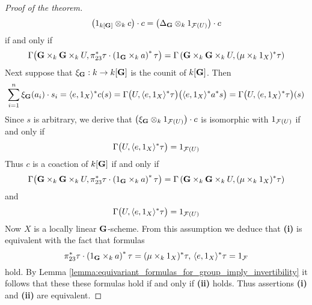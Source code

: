 \begin{proof}[Proof of the theorem]
$$\big(1_{k[\mathbf{G}]}\otimes_k c\big) \cdot c = \big(\Delta_{\mathbf{G}}\otimes_k 1_{{\mathcal F}(U)}\big)\cdot c$$
if and only if
$$\Gamma\big(\mathbf{G}\times_k \mathbf{G} \times_kU, \pi_{23}^*\tau\cdot \left(1_{\mathbf{G}}\times_k a\right)^*\tau \big) = \Gamma\left(\mathbf{G}\times_k\mathbf{G}\times_kU, (\mu\times_k 1_X)^*\tau \right)$$
Next suppose that $\xi_{\mathbf{G}}:k\rightarrow k[\mathbf{G}]$ is the counit of $k[\mathbf{G}]$. Then
$$\sum_{i=1}^n \xi_{\mathbf{G}}(a_i) \cdot s_i = \langle e, 1_X\rangle^*c(s) = \Gamma\big(U, \langle e,1_X \rangle^*\tau \big)\big(\langle e, 1_X\rangle^*a^*s\big) = \Gamma\big(U, \langle e, 1_X \rangle^*\tau \big)(s)$$
Since $s$ is arbitrary, we derive that $\big(\xi_{\mathbf{G}} \otimes_k 1_{{\mathcal F}(U)}\big)\cdot c$ is isomorphic with $1_{{\mathcal F}(U)}$ if and only if
$$\Gamma\big(U, \langle e, 1_X \rangle^*\tau \big) = 1_{{\mathcal F}(U)}$$
Thus $c$ is a coaction of $k[\mathbf{G}]$ if and only if
$$\Gamma\big(\mathbf{G}\times_k \mathbf{G} \times_kU, \pi_{23}^*\tau\cdot \left(1_{\mathbf{G}}\times_k a\right)^*\tau \big) = \Gamma\left(\mathbf{G}\times_k\mathbf{G}\times_kU, (\mu\times_k 1_X)^*\tau \right)$$
and
$$\Gamma\big(U, \langle e,1_X \rangle^*\tau \big) = 1_{{\mathcal F}(U)}$$
Now $X$ is a locally linear $\mathbf{G}$-scheme. From this assumption we deduce that \textbf{(i)} is equivalent with the fact that formulas
$$\pi_{23}^*\tau\cdot \left(1_{\mathbf{G}}\times_k a\right)^*\tau= (\mu\times_k 1_X)^*\tau,\,\langle e,1_X \rangle^*\tau = 1_{{\mathcal F}}$$
hold. By Lemma \ref{lemma:equivariant_formulas_for_group_imply_invertibility} it follows that these these formulas hold if and only if \textbf{(ii)} holds. Thus assertions \textbf{(i)} and \textbf{(ii)} are equivalent.
\end{proof}

